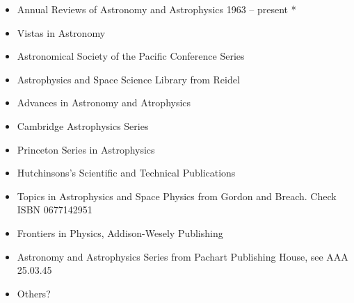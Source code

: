 \begin{itemize}
  \item Annual Reviews of Astronomy and Astrophysics 1963 -- present *
  \item Vistas in Astronomy
  \item Astronomical Society of the Pacific Conference Series
  \item Astrophysics and Space Science Library from Reidel
  \item Advances in Astronomy and Atrophysics
  \item Cambridge Astrophysics Series
  \item Princeton Series in Astrophysics
  \item Hutchinsons's Scientific and Technical Publications
  \item Topics in Astrophysics and Space Physics from Gordon and Breach. Check ISBN 0677142951
  \item Frontiers in Physics, Addison-Wesely Publishing
  \item Astronomy and Astrophysics Series from Pachart Publishing House, see AAA 25.03.45
  \item Others?
\end{itemize}

